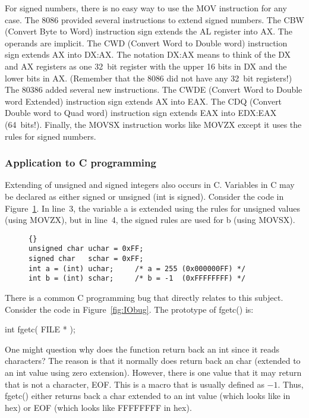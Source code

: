 For signed numbers, there is no easy way to use the {\code MOV}
instruction for any case. The 8086 provided several instructions to
extend signed numbers.  The {\code CBW}  (Convert Byte to
Word) instruction sign extends the AL register into AX. The operands
are implicit. The {\code CWD}  (Convert Word to Double
word) instruction sign extends AX into DX:AX. The notation DX:AX means
to think of the DX and AX registers as one 32~bit register with the
upper 16 bits in DX and the lower bits in AX. (Remember that the 8086
did not have any 32~bit registers!) The 80386 added several new
instructions. The {\code CWDE}  (Convert Word to Double
word Extended) instruction sign extends AX into EAX. The {\code CDQ}
 (Convert Double word to Quad word) instruction sign
extends EAX into EDX:EAX (64~bits!). Finally, the
{\code MOVSX}  instruction works like {\code MOVZX}
except it uses the rules for signed numbers.

\subsubsection{Application to C programming}

Extending  of unsigned and signed integers also occurs
in C. Variables in C may be declared as either signed or unsigned
({\code int} is signed). Consider the code in
Figure~\ref{fig:charExt}.  In line~3, the variable {\code a} is
extended using the rules for unsigned values (using {\code MOVZX}), but in 
line~4, the signed rules are used for {\code b} (using {\code MOVSX}).

\begin{figure}[t]
\begin{lstlisting}[frame=tlrb]{}
unsigned char uchar = 0xFF;
signed char   schar = 0xFF;
int a = (int) uchar;     /* a = 255 (0x000000FF) */
int b = (int) schar;     /* b = -1  (0xFFFFFFFF) */
\end{lstlisting}
\caption{}
\label{fig:charExt}
\end{figure}

\begin{samepage}
There is a common C programming bug that directly relates to this subject.
Consider the code in Figure~\ref{fig:IObug}. The prototype of 
{\code fgetc()} is:
\begin{CodeQuote}
int fgetc( FILE * );
\end{CodeQuote}
One might question why does the function return back an {\code int}
since it reads characters? The reason is that it normally does return
back an {\code char} (extended to an {\code int} value using zero
extension). However, there is one value that it may return that is not
a character, {\code EOF}. This is a macro that is usually defined as
$-1$. Thus, {\code fgetc()} either returns back a {\code char}
extended to an {\code int} value (which looks like {} in hex) or {\code EOF} (which looks like {\code FFFFFFFF} in
hex).
\end{samepage}


